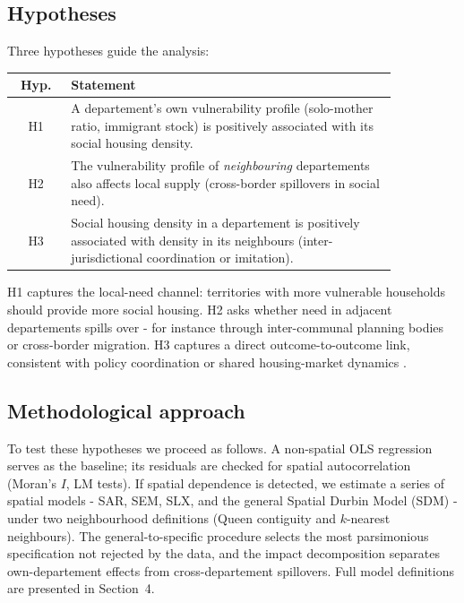 \documentclass[a4paper,12pt]{article}
\begin{document}
\subsection{Hypotheses}

Three hypotheses guide the analysis:

\begin{center}
\renewcommand{\arraystretch}{1.3}
\begin{tabular}{cp{0.85\linewidth}}
\toprule
\textbf{Hyp.} & \textbf{Statement} \\
\midrule
H1 & A departement's own vulnerability profile (solo-mother ratio, immigrant stock) is positively associated with its social housing density. \\
H2 & The vulnerability profile of \emph{neighbouring} departements also affects local supply (cross-border spillovers in social need). \\
H3 & Social housing density in a departement is positively associated with density in its neighbours (inter-jurisdictional coordination or imitation). \\
\bottomrule
\end{tabular}
\end{center}

H1 captures the local-need channel: territories with more vulnerable households should provide more social housing. H2 asks whether need in adjacent departements spills over - for instance through inter-communal planning bodies or cross-border migration. H3 captures a direct outcome-to-outcome link, consistent with policy coordination or shared housing-market dynamics \citep{wang2025, beenstock2015}.

\subsection{Methodological approach}

To test these hypotheses we proceed as follows. A non-spatial OLS regression serves as the baseline; its residuals are checked for spatial autocorrelation (Moran's $I$, LM tests). If spatial dependence is detected, we estimate a series of spatial models - SAR, SEM, SLX, and the general Spatial Durbin Model (SDM) - under two neighbourhood definitions (Queen contiguity and $k$-nearest neighbours). The \citet{elhorst2010} general-to-specific procedure selects the most parsimonious specification not rejected by the data, and the impact decomposition separates own-departement effects from cross-departement spillovers. Full model definitions are presented in Section~4.
\end{document}
